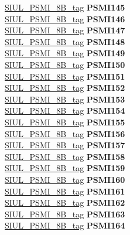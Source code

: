 \begin{DoxyCompactItemize}
\begin{tabbing}
\>\>\mbox{\hyperlink{unionSIUL__PSMI__8B__tag}{SIUL\_PSMI\_8B\_tag}} {\bfseries PSMI145}\\
\>\>\mbox{\hyperlink{unionSIUL__PSMI__8B__tag}{SIUL\_PSMI\_8B\_tag}} {\bfseries PSMI146}\\
\>\>\mbox{\hyperlink{unionSIUL__PSMI__8B__tag}{SIUL\_PSMI\_8B\_tag}} {\bfseries PSMI147}\\
\>\>\mbox{\hyperlink{unionSIUL__PSMI__8B__tag}{SIUL\_PSMI\_8B\_tag}} {\bfseries PSMI148}\\
\>\>\mbox{\hyperlink{unionSIUL__PSMI__8B__tag}{SIUL\_PSMI\_8B\_tag}} {\bfseries PSMI149}\\
\>\>\mbox{\hyperlink{unionSIUL__PSMI__8B__tag}{SIUL\_PSMI\_8B\_tag}} {\bfseries PSMI150}\\
\>\>\mbox{\hyperlink{unionSIUL__PSMI__8B__tag}{SIUL\_PSMI\_8B\_tag}} {\bfseries PSMI151}\\
\>\>\mbox{\hyperlink{unionSIUL__PSMI__8B__tag}{SIUL\_PSMI\_8B\_tag}} {\bfseries PSMI152}\\
\>\>\mbox{\hyperlink{unionSIUL__PSMI__8B__tag}{SIUL\_PSMI\_8B\_tag}} {\bfseries PSMI153}\\
\>\>\mbox{\hyperlink{unionSIUL__PSMI__8B__tag}{SIUL\_PSMI\_8B\_tag}} {\bfseries PSMI154}\\
\>\>\mbox{\hyperlink{unionSIUL__PSMI__8B__tag}{SIUL\_PSMI\_8B\_tag}} {\bfseries PSMI155}\\
\>\>\mbox{\hyperlink{unionSIUL__PSMI__8B__tag}{SIUL\_PSMI\_8B\_tag}} {\bfseries PSMI156}\\
\>\>\mbox{\hyperlink{unionSIUL__PSMI__8B__tag}{SIUL\_PSMI\_8B\_tag}} {\bfseries PSMI157}\\
\>\>\mbox{\hyperlink{unionSIUL__PSMI__8B__tag}{SIUL\_PSMI\_8B\_tag}} {\bfseries PSMI158}\\
\>\>\mbox{\hyperlink{unionSIUL__PSMI__8B__tag}{SIUL\_PSMI\_8B\_tag}} {\bfseries PSMI159}\\
\>\>\mbox{\hyperlink{unionSIUL__PSMI__8B__tag}{SIUL\_PSMI\_8B\_tag}} {\bfseries PSMI160}\\
\>\>\mbox{\hyperlink{unionSIUL__PSMI__8B__tag}{SIUL\_PSMI\_8B\_tag}} {\bfseries PSMI161}\\
\>\>\mbox{\hyperlink{unionSIUL__PSMI__8B__tag}{SIUL\_PSMI\_8B\_tag}} {\bfseries PSMI162}\\
\>\>\mbox{\hyperlink{unionSIUL__PSMI__8B__tag}{SIUL\_PSMI\_8B\_tag}} {\bfseries PSMI163}\\
\>\>\mbox{\hyperlink{unionSIUL__PSMI__8B__tag}{SIUL\_PSMI\_8B\_tag}} {\bfseries PSMI164}\\

\end{tabbing}
\end{DoxyCompactItemize}

